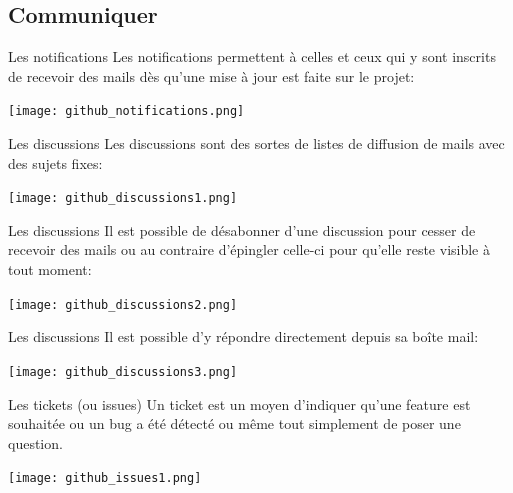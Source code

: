 \documentclass{beamer}
\begin{document}
\subsection{Communiquer}
\begin{frame}{Les notifications}
Les notifications permettent à celles et ceux qui y sont inscrits de recevoir des mails dès qu'une mise à jour est faite sur le projet:
\begin{center}
	\texttt{[image: github\_notifications.png]}
\end{center}
\end{frame}

\begin{frame}{Les discussions}
Les discussions sont des sortes de listes de diffusion de mails avec des sujets fixes:
\begin{center}
	\texttt{[image: github\_discussions1.png]}
\end{center}
\end{frame}

\begin{frame}{Les discussions}
Il est possible de désabonner d'une discussion pour cesser de recevoir des mails ou au contraire d'épingler celle-ci pour qu'elle reste visible à tout moment:
\begin{center}
	\texttt{[image: github\_discussions2.png]}
\end{center}
\end{frame}

\begin{frame}{Les discussions}
Il est possible d'y répondre directement depuis sa boîte mail:
\begin{center}
	\texttt{[image: github\_discussions3.png]}
\end{center}
\end{frame}

\begin{frame}{Les tickets (ou issues)}
Un ticket est un moyen d'indiquer qu'une feature est souhaitée ou un bug a été détecté ou même tout simplement de poser une question.
\begin{center}
	\texttt{[image: github\_issues1.png]}
\end{center}
\end{frame}
\end{document}
